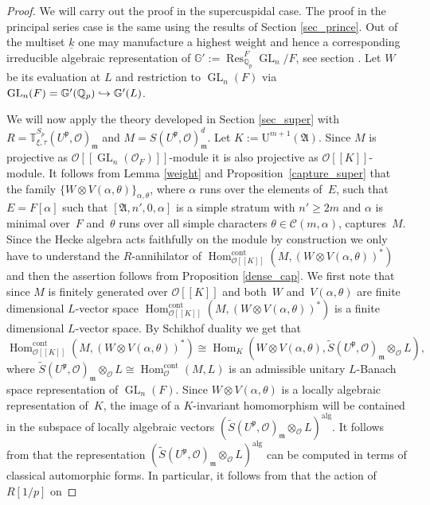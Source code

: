 \documentclass[JEP,XML,SOM,Unicode,NoEqCountersInSection]{cedram}
\let\mathcal\mathscr
\newcommand\hto{\mathrel{\lhook\joinrel\to}}
\theoremstyle{definition}
\DeclareMathOperator{\Hom}{Hom}
\DeclareMathOperator{\Res}{Res}
\DeclareMathOperator{\GL}{GL}
\newcommand{\br}[1]{[\![#1]\!]}
\newcommand{\Qp}{\mathbb {Q}_p}
\newcommand{\Aa}{\mathfrak A}
\newcommand{\mm}{\mathfrak m}
\newcommand{\cO}{\mathcal{O}}
\newcommand{\TT}{\mathbb T}
\newcommand{\pp}{\mathfrak p}
\newcommand{\alg}{\mathrm{alg}}
\newcommand{\cont}{\mathrm{cont}}
\newcommand{\UU}{\mathrm U}
\begin{document}
\begin{proof} We will carry out the proof in the supercuspidal case. The proof in the principal series case is the same using the results of Section \ref{sec_prince}. Out of the multiset $\underline{k}$ one may manufacture a highest weight and hence a corresponding irreducible algebraic representation
of $\mathbb G':=\Res^F_{\Qp} \GL_n/F$, see section \cite[\S 1.8]{six-authors}. Let $W$ be its evaluation at $L$ and restriction to $\GL_n(F)$ via
$\GL_n(F)=\mathbb{G}'(\Qp)\hto \mathbb{G}'(L)$.

We will now apply the theory developed in Section \ref{sec_super} with
$R= \TT^{S_p}_{\xi, \tau}(U^{\pp}, \cO)_{\mm}$ and
$M= S(U^\pp, \cO)_{\mm}^d$. Let $K:=\UU^{m+1}(\Aa)$.
Since $M$ is projective as $\cO\br{\GL_n(\cO_F)}$-module
it is also projective as $\cO\br{K}$-module.
It follows from Lemma \ref{weight} and Proposition~\ref{capture_super} that the family $\{W\otimes V(\alpha, \theta)\}_{\alpha, \theta}$, where $\alpha$ runs over the elements of~$E$, such that
$E=F[\alpha]$ such that $[\Aa, n', 0, \alpha]$ is a simple stratum with $n'\ge 2m$ and $\alpha$ is minimal over~$F$ and~$\theta$ runs over all simple characters
$\theta\in \mathcal C(m, \alpha)$, captures~$M$.
Since the Hecke algebra acts faithfully on the module by construction
we only have to understand the
$R$-annihilator of $\Hom^{\cont}_{\cO\br{K}}(M, (W\otimes V(\alpha, \theta))^*)$ and then the assertion follows from Proposition \ref{dense_cap}. We first note that
since $M$ is finitely generated over $\cO\br{K}$ and both~$W$ and~$V(\alpha, \theta)$ are finite dimensional $L$-vector space \hbox{$\Hom^{\cont}_{\cO\br{K}}(M, (W\otimes V(\alpha, \theta))^*)$} is a finite dimensional $L$-vector space. By Schikhof
duality we get that
\[
\Hom^{\cont}_{\cO\br{K}}(M, (W\otimes V(\alpha, \theta))^*)\cong
\Hom_K(W\otimes V(\alpha, \theta), \tilde{S}(U^{\pp}, \cO)_{\mm}\otimes_{\cO} L),
\]
where $\tilde{S}(U^{\pp}, \cO)_{\mm}\otimes_{\cO} L\cong \Hom^{\cont}_{\cO} (M, L)$ is an admissible unitary $L$-Banach space representation of $\GL_n(F)$. Since
$W\otimes V(\alpha, \theta)$ is a locally algebraic representation of~$K$, the image of a $K$-invariant homomorphism will be contained in the subspace of locally algebraic vectors $(\tilde{S}(U^{\pp}, \cO)_{\mm}\otimes_{\cO} L)^\alg$. It follows from \cite[Prop.\,3.2.4]{em0} that the representation $(\tilde{S}(U^{\pp}, \cO)_{\mm}\otimes_{\cO} L)^\alg$ can be computed in terms of classical automorphic forms.
In particular, it follows from \cite[Prop.\,6.11]{gross} that the action of
$R[1/p]$ on

\end{proof}
\end{document}
